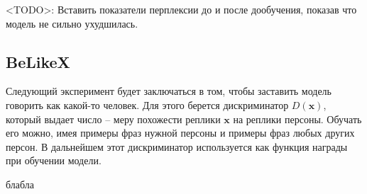 \documentclass[]{article}
\begin{document}
<TODO>: Вставить показатели перплексии до и после дообучения, показав что модель не сильно ухудшилась.

\subsection{BeLikeX}

Следующий эксперимент будет заключаться в том, чтобы заставить модель говорить как какой-то человек. Для этого берется дискриминатор $D(\mathbf{x})$, который выдает число -- меру похожести реплики $\mathbf{x}$ на реплики персоны. Обучать его можно, имея примеры фраз нужной персоны и примеры фраз любых других персон. В дальнейшем этот дискриминатор используется как функция награды при обучении модели.

блабла


\newpage

%

\end{document}
